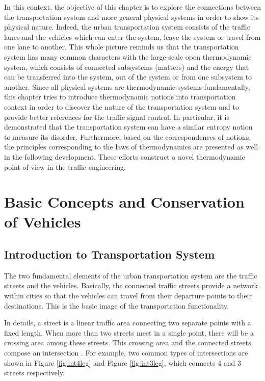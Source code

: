 \documentclass[preprint,authoryear,12pt]{elsarticle}
\begin{document}
In this context, the objective of this chapter is to explore the
connections between the transportation system and more general
physical systems in order to show its physical nature.
%
Indeed, the urban transportation system consists of the traffic lanes
and the vehicles which can enter the system, leave the system or
travel from one lane to another. This whole picture reminds us that
the transportation system has many common characters with the
large-scale open thermodynamic system, which consists of connected
subsystems (matters) and the energy that can be transferred into the
system, out of the system or from one subsystem to another. Since all
physical systems are thermodynamic systems fundamentally, this
chapter tries to introduce thermodynamic notions into transportation
context in order to discover the nature of the transportation system
and to provide better references for the traffic signal control. In
particular, it is demonstrated that the transportation system can
have a similar entropy notion to measure its disorder. Furthermore,
based on the correspondences of notions, the principles corresponding
to the laws of thermodynamics are presented as well in the following
development. These efforts construct a novel thermodynamic point of
view in the traffic engineering.

\section{Basic Concepts and Conservation of Vehicles}

\subsection{Introduction to Transportation System}

The two fundamental elements of the urban transportation system are
the traffic streets and the vehicles. Basically, the connected
traffic streets provide a network within cities so that the vehicles
can travel from their departure points to their destinations. This is
the basic image of the transportation functionality.

In details, a street is a linear traffic area connecting two separate
points with a fixed length. When more than two streets meet in a
single point, there will be a crossing area among these streets. This
crossing area and the connected streets compose an intersection
\citep{papageorgiou_review_2003}. For example, two common types of
intersections are shown in Figure \ref{fig:int4leg} and Figure
\ref{fig:int3leg}, which connects 4 and 3 streets respectively.
\end{document}
